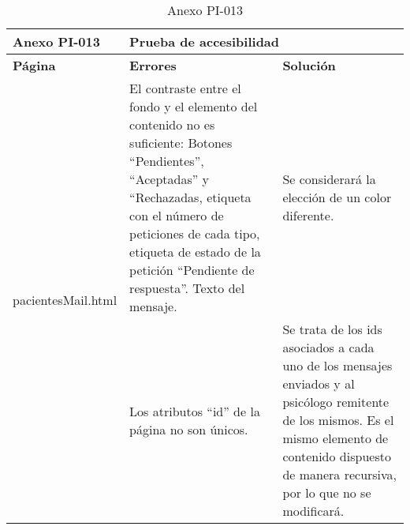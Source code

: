 \begin{table}[htpb]
\centering
\begin{tabularx}{\textwidth}{|l|X|X|}
\hline
\textbf{Anexo PI-013}               & \multicolumn{2}{l|}{\textbf{Prueba de accesibilidad}}                                                                                                                                                                                                                                                                                                                                                                                                            \\ \hline
\textbf{Página}                     & \textbf{Errores}                                                                                                                                                                                                                                       & \textbf{Solución}                                                                                                                                                                                       \\ \hline
\multirow{2}{*}{pacientesMail.html} & El contraste entre el fondo y el elemento del contenido no es suficiente: Botones “Pendientes”, “Aceptadas” y “Rechazadas, etiqueta con el número de peticiones de cada tipo, etiqueta de estado de la petición “Pendiente de respuesta”. Texto del mensaje. & Se considerará la elección de un color diferente.                                                                                                                                                       \\ \cline{2-3} 
                                    & Los atributos “id” de la página no son únicos.                                                                                                                                                                                                         & Se trata de los ids asociados a cada uno de los mensajes enviados y al psicólogo remitente de los mismos. Es el mismo elemento de contenido dispuesto de manera recursiva, por lo que no se modificará. \\ \hline
\end{tabularx}
\caption{Anexo PI-013}
\end{table}


